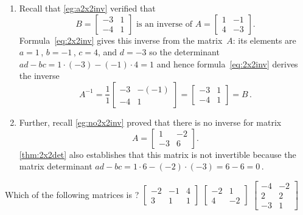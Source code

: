 \begin{example} 
\begin{enumerate}
\item Recall that \cref{eg:a2x2inv} verified that
\begin{equation*}
B=\begin{bmatrix} -3&1\\-4&1 \end{bmatrix}
\text{ is an inverse of }
A=\begin{bmatrix} 1&-1\\4&-3 \end{bmatrix}.
\end{equation*}
Formula~\eqref{eq:2x2inv} gives this inverse from the matrix~\(A\): its elements are \(a=1\)\,, \(b=-1\)\,, \(c=4\), and \(d=-3\) so the determinant \(ad-bc=1\cdot(-3)-(-1)\cdot4=1\) and hence formula~\eqref{eq:2x2inv} derives the inverse
\begin{equation*}
A^{-1}=\frac11\begin{bmatrix} -3&-(-1)\\-4&1 \end{bmatrix}
=\begin{bmatrix} -3&1\\-4&1 \end{bmatrix}=B\,.
\end{equation*}

\item Further, recall \cref{eg:no2x2inv} proved that there is no inverse for matrix
\begin{equation*}
A=\begin{bmatrix} 1&-2\\-3&6 \end{bmatrix}.
\end{equation*}
\cref{thm:2x2det} also establishes that this matrix is not invertible because the matrix determinant \(ad-bc=1\cdot6-(-2)\cdot(-3)=6-6=0\)\,. 
\end{enumerate}
\end{example}




\begin{activity}
Which of the following matrices is ?
{\(\begin{bmatrix} -2&-1&4\\3&1&1 \end{bmatrix}\)}
{\(\begin{bmatrix} -2&1\\4&-2 \end{bmatrix}\)}
{\(\begin{bmatrix} -4&-2\\2&2\\-3&1 \end{bmatrix}\)}
\end{activity}



